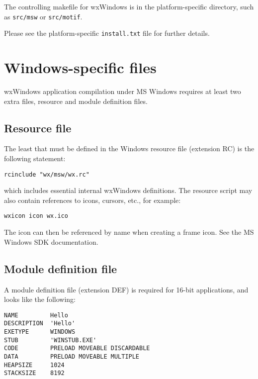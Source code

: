 The controlling makefile for wxWindows is in the platform-specific
directory, such as {\tt src/msw} or {\tt src/motif}.

Please see the platform-specific {\tt install.txt} file for further details.

\section{Windows-specific files}

wxWindows application compilation under MS Windows requires at least two
extra files, resource and module definition files.

\subsection{Resource file}\label{resources}

The least that must be defined in the Windows resource file (extension RC)
is the following statement:

\begin{verbatim}
rcinclude "wx/msw/wx.rc"
\end{verbatim}

which includes essential internal wxWindows definitions.  The resource script
may also contain references to icons, cursors, etc., for example:

\begin{verbatim}
wxicon icon wx.ico
\end{verbatim}

The icon can then be referenced by name when creating a frame icon. See
the MS Windows SDK documentation.


\subsection{Module definition file}

A module definition file (extension DEF) is required for 16-bit applications, and
looks like the following:

\begin{verbatim}
NAME         Hello
DESCRIPTION  'Hello'
EXETYPE      WINDOWS
STUB         'WINSTUB.EXE'
CODE         PRELOAD MOVEABLE DISCARDABLE
DATA         PRELOAD MOVEABLE MULTIPLE
HEAPSIZE     1024
STACKSIZE    8192
\end{verbatim}

